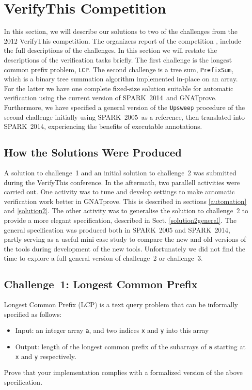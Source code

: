 \documentclass[sttt,final]{svjour}
\newcommand{\gnatprove}{GNATprove\xspace}
\newcommand{\oldspark}{SPARK~2005\xspace}
\newcommand{\newspark}{SPARK~2014\xspace}
\begin{document}
\section{VerifyThis Competition}
\label{verifythis}
In this section, we will describe our solutions to two of the
challenges from the 2012 VerifyThis competition. The organizers report
of the competition \cite {verifythis2012}, include the full
descriptions of the challenges. In this section we will restate the
descriptions of the verification tasks briefly. The first challenge is
the longest common prefix problem, \verb|LCP|. The second challenge is
a tree sum, \verb|PrefixSum|, which is a binary tree summation
algorithm implemented in-place on an array. For the latter we have one
complete fixed-size solution suitable for automatic verification using
the current version of \newspark\ and \gnatprove. Furthermore, we have
specified a general version of the \verb|Upsweep| procedure of the
second challenge initially using \oldspark\ as a reference, then
translated into \newspark, experiencing the benefits of executable
annotations.

\subsection{How the Solutions Were Produced}
A solution to challenge~1 and an initial solution to challenge~2 was
submitted during the VerifyThis conference. In the aftermath, two
parallell activities were carried out. One activity was to tune and
develop settings to make automatic verification work better in
\gnatprove. This is described in sections \ref {automation} and
\ref{solution2}. The other activity was to generalise the solution to
challenge~2 to provide a more elegant specification, described in
Sect. \ref{solution2general}. The general specification was produced
both in \oldspark and \newspark, partly serving as a useful mini case
study to compare the new and old versions of the tools during
development of the new tools. Unfortunately we did not find the time
to explore a full general version of challenge~2 or challenge~3.

\subsection{Challenge~1: Longest Common Prefix}
Longest Common Prefix (LCP) is a text query problem that can be
informally specified as follows:

\begin{itemize}
\item Input: an integer array \verb|a|, and two indices \verb|x| and
  \verb|y| into this array
\item Output: length of the longest common prefix of the subarrays of
  \verb|a| starting at \verb|x| and \verb|y| respectively.
\end{itemize}
%
Prove that your implementation complies with a formalized
version of the above specification.
\end{document}
